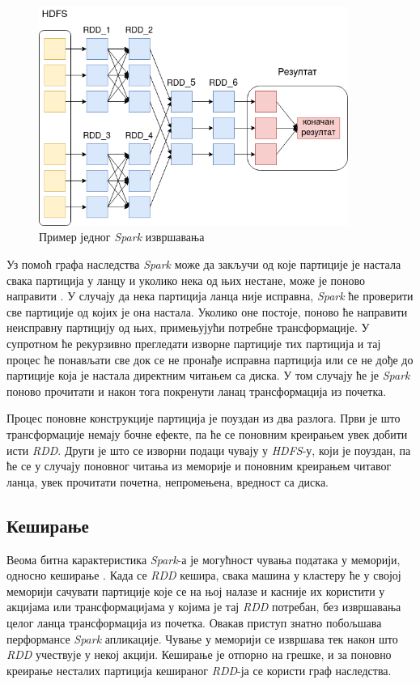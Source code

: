 \documentclass[12pt,oneside]{memoir}
\begin{document}
\begin{figure}[!ht]
  \centering
  \includegraphics[width=0.9\textwidth]{pictures/spark_ppln.png}
  \caption{Пример једног \textit{Spark} извршавања}
  \label{fig:sprk_ppln}
\end{figure}

Уз помоћ графа наследства \textit{Spark} може да закључи од које партиције је настала свака партиција у ланцу и уколико нека од њих нестане, може је поново направити \cite{hadoop_learning}. У случају да нека партиција ланца није исправна, \textit{Spark} ће проверити све партиције од којих је она настала. Уколико оне постоје, поново ће направити неисправну партицију од њих, примењујући потребне трансформације. У супротном ће рекурзивно прегледати изворне партиције тих партиција и тај процес ће понављати све док се не пронађе исправна партиција или се не дође до партиције која је настала директним читањем са диска. У том случају ће је \textit{Spark} поново прочитати и након тога покренути ланац трансформација из почетка.

Процес поновне конструкције партиција је поуздан из два разлога. Први је што трансформације немају бочне ефекте, па ће се поновним креирањем увек добити исти \textit{RDD}. Други је што се изворни подаци чувају у \textit{HDFS}-у, који је поуздан, па ће се у случају поновног читања из меморије и поновним креирањем читавог ланца, увек прочитати почетна, непромењена, вредност са диска.

\subsection{Кеширање}
\label{subsec:spark_persist}

Веома битна карактеристика \textit{Spark}-а је могућност чувања података у меморији, односно кеширање \cite{spark_rdd}. Када се \textit{RDD} кешира, свака машина у кластеру ће у својој меморији сачувати партиције које се на њој налазе и касније их користити у акцијама или трансформацијама у којима је тај \textit{RDD} потребан, без извршавања целог ланца трансформација из почетка. Овакав приступ знатно побољшава перформансе \textit{Spark} апликације. Чување у меморији се извршава тек након што \textit{RDD} учествује у некој акцији. Кеширање је отпорно на грешке, и за поновно креирање несталих партиција кешираног \textit{RDD}-ја се користи граф наследства.
\end{document}

